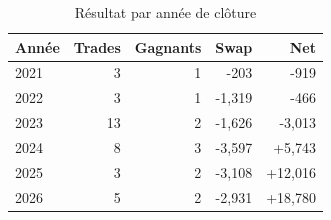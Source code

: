 \begin{table}[H]
\centering
\begin{tabular}{@{}lrrrr@{}}
\toprule
Année & Trades & Gagnants & Swap & Net \\
\midrule
2021 & 3 & 1 & -203 & -919 \\
2022 & 3 & 1 & -1,319 & -466 \\
2023 & 13 & 2 & -1,626 & -3,013 \\
2024 & 8 & 3 & -3,597 & +5,743 \\
2025 & 3 & 2 & -3,108 & +12,016 \\
2026 & 5 & 2 & -2,931 & +18,780 \\
\bottomrule
\end{tabular}
\caption{Résultat par année de clôture}
\end{table}
